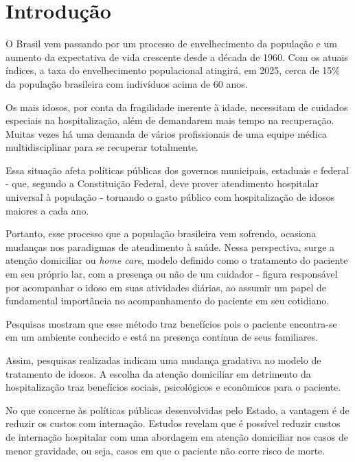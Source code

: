 \chapter{Introdução}\label{cap:introducao}

O Brasil vem passando por um processo de envelhecimento da população e
um aumento da expectativa de vida crescente desde a década de 1960. 
Com os atuais índices, a taxa do envelhecimento populacional atingirá, 
em 2025, cerca de 15\% da população brasileira com indivíduos acima 
de 60 anos. 

Os mais idosos, por conta da fragilidade inerente à idade, necessitam de 
cuidados especiais na hospitalização, além de demandarem mais tempo na 
recuperação. Muitas vezes há uma demanda de vários profissionais de uma equipe 
médica multidisciplinar para se recuperar totalmente.

Essa situação afeta políticas públicas dos governos municipais, estaduais e federal -
que, segundo a Constituição Federal, deve prover atendimento hospitalar
universal à população - tornando o gasto público com hospitalização de idosos
maiores a cada ano.

Portanto, esse processo que a população brasileira vem sofrendo, ocasiona mudanças 
nos paradigmas de atendimento à saúde. Nessa perspectiva, surge a atenção domiciliar
ou \textit{home care}, modelo definido como o tratamento do paciente 
em seu próprio lar, com a presença ou não de um cuidador - figura responsável
por acompanhar o idoso em suas atividades diárias, ao assumir um papel 
de fundamental importância no acompanhamento do paciente em seu cotidiano. 

Pesquisas mostram que esse método traz benefícios pois o 
paciente encontra-se em um ambiente conhecido e está na presença contínua de
seus familiares.

Assim, pesquisas realizadas indicam uma mudança gradativa no modelo de
tratamento de idosos. A escolha da atenção domiciliar em detrimento da
hospitalização traz benefícios sociais, psicológicos e
econômicos para o paciente. %

No que concerne às políticas públicas desenvolvidas pelo Estado, 
a vantagem é de reduzir os custos com internação. Estudos revelam 
que é possível reduzir custos de internação hospitalar com uma 
abordagem em atenção domiciliar nos casos de menor gravidade, 
ou seja, casos em que o paciente não corre risco de morte. 

